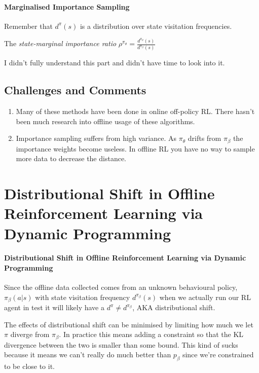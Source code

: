 \documentclass{article}
\begin{document}
  \paragraph{Marginalised Importance Sampling} Remember that \(d^{\pi}(s)\) is a distribution over state visitation frequencies.

  The \emph{state-marginal importance ratio} \(\rho^{\pi_{\theta}}= \frac{d^{\pi_{\theta}}(s)}{d^{\pi_{\beta}}(s)} \)


  I didn't fully understand this part and didn't have time to look into it.

\subsection{Challenges and Comments}
\begin{enumerate}
  \item Many of these methods have been done in online off-policy RL. There hasn't been much research into offline usage of these algorithms.
  \item Importance sampling suffers from high variance. As \(\pi_{\theta}\) drifts from \(\pi_{\beta}\) the importance weights become useless. In offline RL you have no way to sample more data to decrease the distance.
\end{enumerate}
\pagebreak
\section{Distributional Shift in Offline Reinforcement Learning via Dynamic Programming}

\paragraph{Distributional Shift in Offline Reinforcement Learning via Dynamic Programming} Since the offline data collected comes from an unknown behavioural policy, \(\pi_{\beta}(a|s)\) with state visitation frequency \(d^{\pi_{\beta}}(s)\) when we actually run our RL agent in test it will likely have a \(d^{\pi} \ne d^{\pi_{\beta}}\), AKA distributional shift.


The effects of distributional shift can be minimised by limiting how much we let \(\pi\) diverge from \(\pi_{\beta}\). In practice this means adding a constraint so that the KL divergence between the two is smaller than some bound. This kind of sucks because it means we can't really do much better than \(p_{\beta}\) since we're constrained to be close to it.
\end{document}
